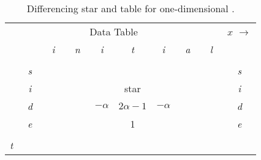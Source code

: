 \par
\begin{table}
\begin{center}
\begin{makeimage}
\begin{tabular}{c||c|c|c|c|c|c|c|c|c||}
 \multicolumn{9}{c}{\rm Data Table} &
\multicolumn{1}{c}{$x$ $\rightarrow$} \\ \cline{2-10}
&   & {\em\ i\ } & {\em\  n\ } & {\em\  i\ } & {\em\  t\ } & {\em\  i\ } & {\em\  a\ } & {\em\  l\ } &    \\ 
 \cline{2-10} 
&   &\multicolumn{6}{c}{ } &  &  \\ 
                       \cline{2-2}       \cline{10-10}
& {\em\ s\ } &\multicolumn{6}{c}{ }  && {\em\  s\ }  \\
                       \cline{2-2}       \cline{10-10}
&{\em i} &\multicolumn{3}{c}{ } 
&\multicolumn{1}{c}{\rm star}
&\multicolumn{2}{c}{ } & &{\em i}      \\
                       \cline{2-2} \cline{5-7} \cline{10-10}
&{\em d} &\multicolumn{1}{c}{ } & &$-\alpha$ & 
$2\alpha - 1$ & $-\alpha$ &\multicolumn{1}{c}{}&&{\em d} \\
                       \cline{2-2} \cline{5-7} \cline{10-10}
&{\em e} &\multicolumn{2}{c}{} & & 1 
&\multicolumn{2}{c}{} & &{\em e}  \\
                      \cline{2-2} \cline{6-6}\cline{10-10}
&   &\multicolumn{6}{c}{} & & \\
{\em t} &   &\multicolumn{6}{c}{} & &  \\
\end{tabular}
\end{makeimage}
\end{center}
\caption{Differencing star and table
for one-dimensional .}
\label{eqn:2-1}
\end{table}
